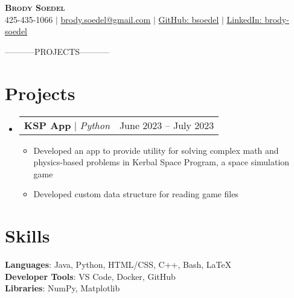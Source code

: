 \documentclass[letterpaper,11pt]{article}
\makeatletter
\newcommand{\resumeItem}[1]{
  \item\small{
    {#1 \vspace{-2pt}}
  }
}
\newcommand{\resumeProjectHeading}[2]{
    \item
    \begin{tabular*}{0.97\textwidth}{l@{\extracolsep{\fill}}r}
      \small#1 & #2 \\
    \end{tabular*}\vspace{-7pt}
}
\newcommand{\resumeSubHeadingListStart}{\begin{itemize}[leftmargin=0.15in, label={}]}
\newcommand{\resumeSubHeadingListEnd}{\end{itemize}}
\newcommand{\resumeItemListStart}{\begin{itemize}}
\newcommand{\resumeItemListEnd}{\end{itemize}\vspace{-5pt}}
\makeatother
\begin{document}

\begin{center}
    \textbf{\Huge \scshape Brody Soedel} \\ \vspace{1pt}
    \small 425-435-1066 $|$ 
      \href{mailto:brody.soedel@gmail.com}{\uline{brody.soedel@gmail.com}} $|$
      \href{https://github.com/bsoedel}{GitHub: \uline{bsoedel}} $|$
      \href{www.linkedin.com/in/brody-soedel}{LinkedIn: \uline{brody-soedel}}
\end{center}




-----------PROJECTS-----------
\section{Projects}
    \resumeSubHeadingListStart
      \resumeProjectHeading
          {\textbf{KSP App} $|$ \emph{Python}}{June 2023 -- July 2023}
          \resumeItemListStart
            \resumeItem{Developed an app to provide utility for solving complex math and physics-based problems
             in Kerbal Space Program, a space simulation game}
            \resumeItem{Developed custom data structure for reading game files}
          \resumeItemListEnd
    \resumeSubHeadingListEnd



%
\section{Skills}
 \begin{itemize}[leftmargin=0.15in, label={}]
    \small{\item{
     \textbf{Languages}{: Java, Python, HTML/CSS, C++, Bash, LaTeX} \\
     \textbf{Developer Tools}{: VS Code, Docker, GitHub} \\
     \textbf{Libraries}{: NumPy, Matplotlib}
    }}
 \end{itemize}
\end{document}
